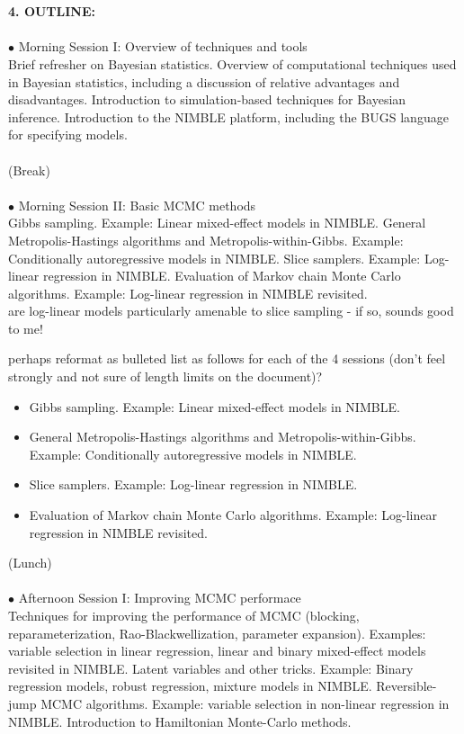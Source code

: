 \documentclass[11pt]{article}
\begin{document}
\\
\\
{\large {\bf 4. OUTLINE:}}\\
\\
$\bullet$ Morning Session I: Overview of techniques and tools\\
Brief refresher on Bayesian statistics.  Overview of computational techniques used in Bayesian statistics, including a discussion of relative advantages and disadvantages.  Introduction to simulation-based techniques for Bayesian inference.  Introduction to the NIMBLE platform, including the BUGS language for specifying models.
\\
\\
(Break)\\
\\
$\bullet$ Morning Session II: Basic MCMC methods\\
Gibbs sampling.  Example:  Linear mixed-effect models in NIMBLE.  General Metropolis-Hastings algorithms and Metropolis-within-Gibbs.  Example:  Conditionally autoregressive models in NIMBLE.  Slice samplers.  Example:  Log-linear regression in NIMBLE.  Evaluation of Markov chain Monte Carlo algorithms.  Example:  Log-linear regression in NIMBLE revisited.  \\
{\color{blue} are log-linear models particularly amenable to slice sampling - if so, sounds good to me!}\\
{\color{blue} perhaps reformat as bulleted list as follows for each of the 4 sessions (don't feel strongly and not sure of length limits on the document)?
\begin{itemize}
\item  Gibbs sampling.  Example:  Linear mixed-effect models in NIMBLE.  
\item General Metropolis-Hastings algorithms and Metropolis-within-Gibbs.  Example:  Conditionally autoregressive models in NIMBLE.  
\item Slice samplers.  Example:  Log-linear regression in NIMBLE.  
\item Evaluation of Markov chain Monte Carlo algorithms.  Example:  Log-linear regression in NIMBLE revisited.  
\end{itemize}}
(Lunch)\\
\\
$\bullet$ Afternoon Session I: Improving MCMC performace\\
Techniques for improving the performance of MCMC (blocking, reparameterization, Rao-Blackwellization, parameter expansion).  Examples:  variable selection in linear regression, linear and binary mixed-effect models revisited in NIMBLE. Latent variables and other tricks.  Example:  Binary regression models, robust regression, mixture models in NIMBLE. Reversible-jump MCMC algorithms.  Example:  variable selection in non-linear regression in NIMBLE.  Introduction to Hamiltonian Monte-Carlo methods.\\
\end{document}
